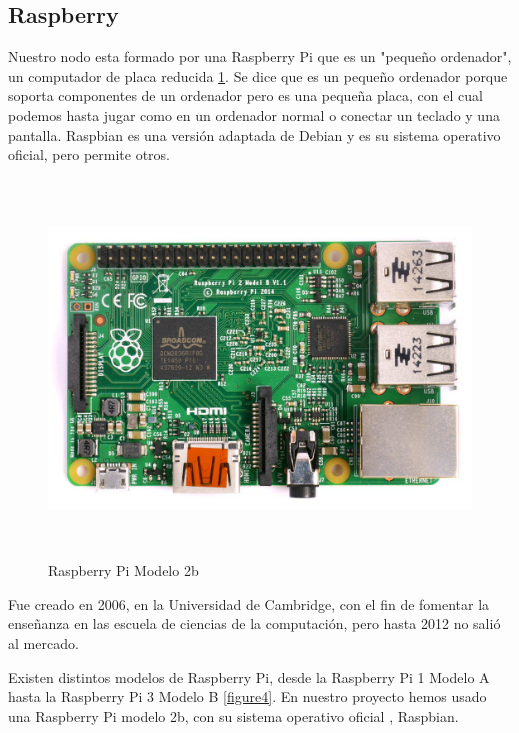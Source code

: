 \subsection{Raspberry}

Nuestro nodo esta formado por una Raspberry Pi que es un "pequeño ordenador", un computador de placa reducida   \ref{figure3}. Se dice que es un pequeño ordenador porque soporta componentes de un ordenador pero es una pequeña placa, con el cual podemos hasta jugar como en un ordenador normal o conectar un teclado y una pantalla.
 Raspbian es una versión adaptada de Debian y es su sistema operativo oficial, pero permite otros.
 
 \begin{figure}[htb]
 	
 	\begin{center}
 		\includegraphics[width=12cm,height=10cm]{figures/Raspberry_Pi.jpg}
 		\caption{Raspberry Pi Modelo 2b}
 	\end{center}
 	
 	\label{figure3}
 \end{figure}
 
Fue creado en 2006, en la Universidad de Cambridge, con el fin de fomentar la enseñanza en las escuela de ciencias de la computación, pero hasta 2012 no salió al mercado.

Existen distintos modelos de Raspberry Pi, desde la Raspberry Pi 1 Modelo A hasta la Raspberry Pi 3 Modelo B \ref{figure4}.
En nuestro proyecto hemos usado una Raspberry Pi modelo 2b, con su sistema operativo oficial , Raspbian.


